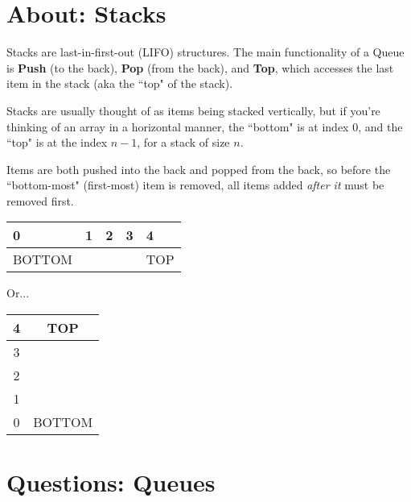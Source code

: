 \documentclass[a4paper,12pt,oneside]{book}
\begin{document}
        
    \newpage
    \section{About: Stacks}

        Stacks are last-in-first-out (LIFO) structures. The main
        functionality of a Queue is \textbf{Push} (to the back),
        \textbf{Pop} (from the back), and \textbf{Top}, which accesses the
        last item in the stack (aka the ``top" of the stack).

        Stacks are usually thought of as items being stacked vertically,
        but if you're thinking of an array in a horizontal manner, the ``bottom"
        is at index 0, and the ``top" is at the index $n-1$, for a stack of size $n$.

        Items are both pushed into the back and popped from the back, so
        before the ``bottom-most" (first-most) item is removed, all items
        added \textit{after it} must be removed first.

        \begin{center}
            \begin{tabular}{ | p{2cm} | p{2cm} | p{2cm} | p{2cm} | p{2cm} |}
                \hline
                0 & 1 & 2 & 3 & 4
                \\ \hline
                BOTTOM & & & & TOP
                \\ \hline
            \end{tabular}
        \end{center}

        Or...

        \begin{center}
            \begin{tabular}{ | c | c |}
                \hline
                4 & TOP
                \\ \hline
                3 &
                \\ \hline
                2 &
                \\ \hline
                1 &
                \\ \hline
                0 & BOTTOM
                \\ \hline
            \end{tabular}
        \end{center}

    \newpage

    \section{Questions: Queues}
\end{document}

